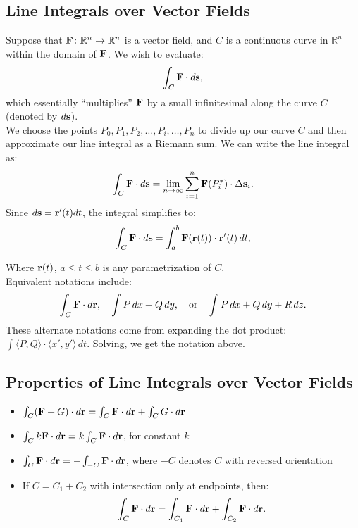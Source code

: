 \subsection{Line Integrals over Vector Fields}
Suppose that \(\mathbf{F} \colon \mathbb{R}^n \to \mathbb{R}^n\) is a vector field, and \(C\) is a continuous curve in \(\mathbb{R}^n\) within the domain of \(\mathbf{F}\). We wish to evaluate:
\[
    \int_C \mathbf{F} \cdot d\mathbf{s}, 
\]
which essentially ``multiplies'' \(\mathbf{F}\) by a small infinitesimal along the curve \(C\) (denoted by \(d\mathbf{s}\)). \\

We choose the points \(P_{0}, P_{1}, P_{2}, \ldots, P_{i},\ldots, P_{n}\) to divide up our curve \(C\) and then approximate our line integral as a Riemann sum. We can write the line integral as:
\[
    \int_C \mathbf{F} \cdot d\mathbf{s} = \lim_{n\to\infty} \sum_{i=1}^{n} \mathbf{F}(P^*_i) \cdot \Delta \mathbf{s}_i. 
\]
Since \(d\mathbf{s} = \mathbf{r}'(t) dt\), the integral simplifies to:
\[
    \int_C \mathbf{F} \cdot d\mathbf{s} = \int_a^b \mathbf{F}(\mathbf{r}(t)) \cdot \mathbf{r}'(t) \, dt, 
\]

Where \(\mathbf{r}(t)\), \(a \leq t \leq b\) is any parametrization of \(C\). \\ 

Equivalent notations include:
\[
    \int_C \mathbf{F} \cdot d\mathbf{r}, \quad \int P \, dx + Q \, dy, \quad \text{or} \quad \int P \, dx + Q \, dy + R \, dz. 
\]
These alternate notations come from expanding the dot product: \(\int\langle P,Q \rangle \cdot \langle x', y' \rangle \, dt\). Solving, we get the notation above.

\subsection{Properties of Line Integrals over Vector Fields}
\begin{itemize}
    \item \(\int_C (\mathbf{F} + G) \cdot d\mathbf{r} = \int_C \mathbf{F} \cdot d\mathbf{r} + \int_C G \cdot d\mathbf{r}\)
    \item \(\int_C k\mathbf{F} \cdot d\mathbf{r} = k \int_C \mathbf{F} \cdot d\mathbf{r}\), for constant \(k\)
    \item \(\int_C \mathbf{F} \cdot d\mathbf{r} = - \int_{-C} \mathbf{F} \cdot d\mathbf{r}\), where \(-C\) denotes \(C\) with reversed orientation
    \item If \(C = C_1 + C_2\) with intersection only at endpoints, then:
    \[
    \int_C \mathbf{F} \cdot d\mathbf{r} = \int_{C_1} \mathbf{F} \cdot d\mathbf{r} + \int_{C_2} \mathbf{F} \cdot d\mathbf{r}. 
\]
\end{itemize}

